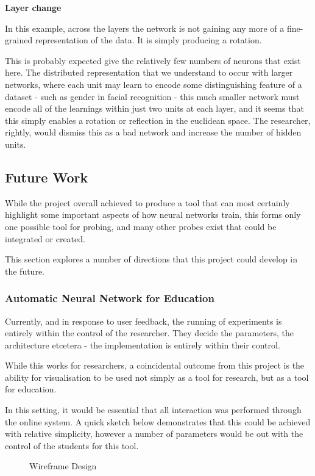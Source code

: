 \documentclass[a4paper,11pt,titlepage]{article}
\begin{document}
	\textbf{Layer change}
	\par 
	In this example, across the layers the network is not gaining any more of a fine-grained representation of the data. It is simply producing a rotation.
	\par 
	This is probably expected give the relatively few numbers of neurons that exist here. The distributed representation that we understand to occur with larger networks, where each unit may learn to encode some distinguishing feature of a dataset - such as gender in facial recognition - this much smaller network must encode all of the learnings within just two units at each layer, and it seems that this simply enables a rotation or reflection in the euclidean space. The researcher, rightly, would dismiss this as a bad network and increase the number of hidden units.

\subsection{Future Work}
	While the project overall achieved to produce a tool that can most certainly highlight some important aspects of how neural networks train, this forms only one possible tool for probing, and many other probes exist that could be integrated or created.
	\par 
	This section explores a number of directions that this project could develop in the future.

	\subsubsection{Automatic Neural Network for Education}		
	Currently, and in response to user feedback, the running of experiments is entirely within the control of the researcher. They decide the parameters, the architecture etcetera - the implementation is entirely within their control.
	\par 
	While this works for researchers, a coincidental outcome from this project is the ability for visualisation to be used not simply as a tool for research, but as a tool for education. 
	\par 
	In this setting, it would be essential that all interaction was performed through the online system. A quick sketch below demonstrates that this could be achieved with relative simplicity, however a number of parameters would be out with the control of the students for this tool.
	
	\begin{figure}[H]
    			\caption{Wireframe Design}%
	\end{figure}	
	
\end{document}
